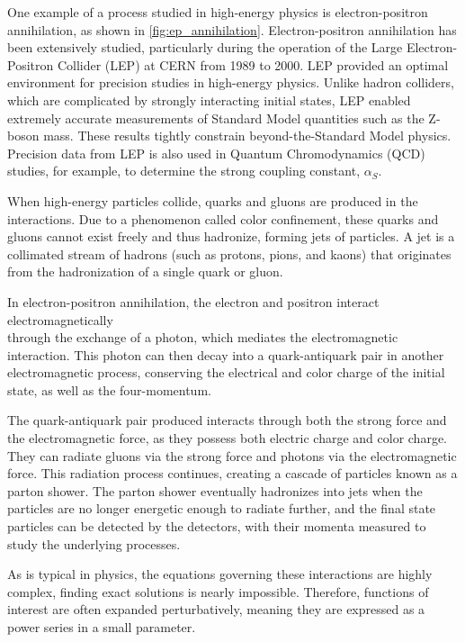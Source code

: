 \documentclass[../main.tex]{subfiles}
\begin{document}
One example of a process studied in high-energy physics is electron-positron annihilation, as shown in \cref{fig:ep_annihilation}. 
Electron-positron annihilation has been extensively studied, particularly during the operation of the Large Electron-Positron Collider (LEP) at CERN from 1989 to 2000. 
LEP provided an optimal environment for precision studies in high-energy physics. 
Unlike hadron colliders, which are complicated by strongly interacting initial states, LEP enabled extremely accurate measurements of Standard Model quantities such as the Z-boson mass. 
These results tightly constrain beyond-the-Standard Model physics. Precision data from LEP is also used in Quantum Chromodynamics (QCD) studies, for example, to determine the strong coupling constant, $\alpha_S$.

When high-energy particles collide, quarks and gluons are produced in the interactions. Due to a phenomenon called color confinement, 
these quarks and gluons cannot exist freely and thus hadronize, forming jets of particles. A jet is a collimated stream of hadrons (such as protons, pions, and kaons)
that originates from the hadronization of a single quark or gluon.

In electron-positron annihilation, the electron and positron interact electromagnetically \\
through the exchange of a photon, which mediates the electromagnetic interaction. 
This photon can then decay into a quark-antiquark pair in another electromagnetic process, conserving the electrical and color charge of the initial state, as well as the four-momentum.

The quark-antiquark pair produced interacts through both the strong force and the electromagnetic force, as they possess both electric charge and color charge.
They can radiate gluons via the strong force and photons via the electromagnetic force. This radiation process continues, creating a cascade of particles known as a parton shower.
The parton shower eventually hadronizes into jets when the particles are no longer energetic enough to radiate further, and the final state particles can be detected by the detectors, with their momenta measured to study the underlying processes.


As is typical in physics, the equations governing these interactions are highly complex, finding exact solutions is nearly impossible.
Therefore, functions of interest are often expanded perturbatively, meaning they are expressed as a power series in a small parameter.
\end{document}
